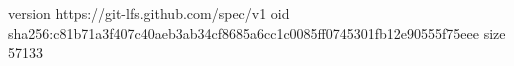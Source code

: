 version https://git-lfs.github.com/spec/v1
oid sha256:c81b71a3f407c40aeb3ab34cf8685a6cc1c0085ff0745301fb12e90555f75eee
size 57133
